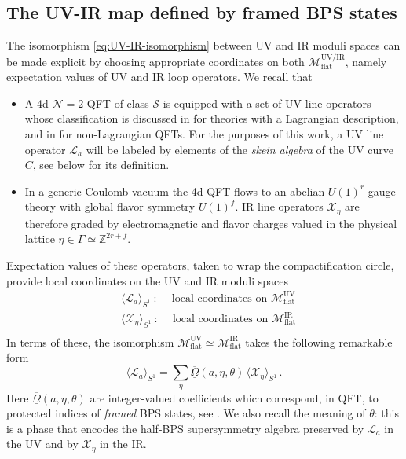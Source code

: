 \documentclass{article}
\numberwithin{equation}{section}
\newcommand{\IZ}{\mathbb{Z}}
\newcommand{\CS}{\mathcal{S}}
\renewcommand{\flat}{\mathrm{flat}}
\def\be{\begin{equation}}
\def\ee{\end{equation}}
\def\IZ{{\mathbb{Z}}}
\def\CM{{\mathcal{M}}}
\def\CN{{\mathcal{N}}}
\def\scL{\mathscr{L}}
\def\scX{\mathscr{X}}
\def\fY{\Gamma}
\def\fOmega{\overline{\underline{\Omega}}}
\begin{document}
\subsection{The UV-IR map defined by framed BPS states}\label{sec:UV-IR-framed}
The isomorphism \eqref{eq:UV-IR-isomorphism} between UV and IR moduli spaces can be made explicit by choosing appropriate coordinates on both $\CM_{\flat}^{\text{UV/IR}}$, namely expectation values of UV and IR loop operators.
We recall that
\begin{itemize}
\item
A 4d $\CN=2$ QFT of class $\CS$ is equipped with a set of UV line operators whose classification is discussed in \cite{Kapustin:2005py, Kapustin:2006pk, Kapustin:2006hi, Gaiotto:2010be, Aharony:2013hda} for theories with a Lagrangian description, and in  \cite{Drukker:2009tz, Xie:2013vfa, Tachikawa:2013hya, Coman:2015lna, Bhardwaj:2021pfz} for non-Lagrangian QFTs. 
%
For the purposes of this work, a UV line operator $\scL_a$ will be labeled by elements of the \textit{skein algebra} of the UV curve $C$, see below for its definition. 
\item
In a generic Coulomb vacuum the 4d QFT flows to an abelian $U(1)^r$ gauge theory with global flavor symmetry $U(1)^f$.
IR line operators $\scX_\eta$ are therefore graded by electromagnetic and flavor charges valued in the physical lattice $\eta\in \fY\simeq \IZ^{2r+f}$.
\end{itemize}

Expectation values of these operators, taken to wrap the compactification circle, provide local coordinates on the UV and IR moduli spaces
\be\label{eq:coordinate-systems}
\begin{split}
	&\langle \scL_a\rangle_{S^1}  \ : \quad \ \text{local coordinates on }\CM_{\flat}^{\text{UV}} \\
	&\langle \scX_\eta\rangle_{S^1} \ : \quad \ \text{local coordinates on }\CM_{\flat}^{\text{IR}} \\
\end{split}
\ee
In terms of these, the isomorphism $\CM_{\flat}^{\text{UV}}\simeq \CM_{\flat}^{\text{IR}}$ 
takes the following remarkable form
\be\label{eq:UV-IR-relation-classical}
	\langle \scL_a\rangle_{S^1} = \sum_{\eta} \fOmega(a,\eta,\theta) \, \langle \scX_\eta\rangle_{S^1}\,.
\ee
Here $\fOmega(a,\eta,\theta)$ are integer-valued coefficients which correspond, in QFT, to protected indices of \textit{framed} BPS states, see \cite{Gaiotto:2010be}. 
We also recall the meaning of $\theta$: this is a phase that encodes the half-BPS supersymmetry algebra preserved by $\scL_a$ in the UV and by $\scX_\eta$ in the IR.
\end{document}
